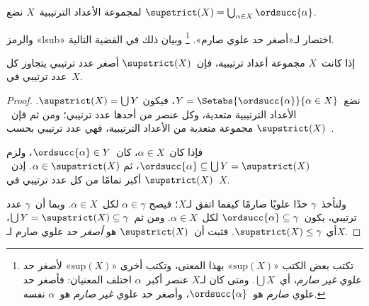 \documentclass[../../../include/open-logic-section]{subfiles}
\begin{document}
\begin{defn}
لمجموعة الأعداد الترتيبية~$X$ نضع
$\supstrict(X) = \bigcup_{\alpha \in X} \ordsucc{\alpha}$.
\end{defn}
\noindent
والرمز «lsub» اختصار لـ«أصغر حد علوي صارم».
\footnote{تكتب بعض الكتب «$\text{sup}(X)$» بهذا المعنى، وتكتب أخرى
«$\text{sup}(X)$» لأصغر حد علوي \emph{غير صارم}، أي~$\bigcup X$.
ومتى كان لـ$X$ عنصر أكبر~$\alpha$ اختلف المعنيان: فأصغر حد علوي
\emph{صارم} هو~$\ordsucc{\alpha}$، وأصغر حد علوي
\emph{غير صارم} هو~$\alpha$ نفسه.}
وبيان ذلك في القضية التالية.

\begin{prop}
إذا كانت~$X$ مجموعة أعداد ترتيبية، فإن~$\supstrict(X)$ أصغر عدد
ترتيبي يتجاوز كل عدد ترتيبي في~$X$.
\end{prop}

\begin{proof}
نضع~$Y = \Setabs{\ordsucc{\alpha}}{\alpha \in X}$، فيكون
$\supstrict(X) = \bigcup Y$. الأعداد الترتيبية متعدية، وكل عنصر
من أحدها عدد ترتيبي؛ ومن ثم فإن~$\supstrict(X)$ مجموعة متعدية من
الأعداد الترتيبية، فهي عدد ترتيبي بحسب~.

فإذا كان~$\alpha \in X$، كان~$\ordsucc{\alpha} \in Y$، ولزم
$\ordsucc{\alpha} \subseteq \bigcup Y = \supstrict(X)$، ثم
$\alpha \in \supstrict(X)$. إذن~$\supstrict(X)$ أكبر تمامًا من
كل عدد ترتيبي في~$X$.

ولنأخذ~$\gamma$ حدًا علويًا صارمًا كيفما اتفق لـ$X$؛ فيصح
$\alpha \in \gamma$ لكل~$\alpha \in X$. وبما أن~$\gamma$ عدد
ترتيبي، يكون~$\ordsucc{\alpha} \subseteq \gamma$ لكل~$\alpha \in X$.
ومن ثم~$\bigcup Y = \supstrict(X) \subseteq \gamma$، أي
$\supstrict(X) \leq \gamma$. فثبت أن~$\supstrict(X)$ هو \emph{أصغر}
حد علوي صارم لـ$X$.
\end{proof}
\end{document}
